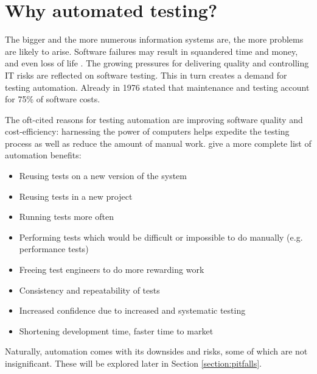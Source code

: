 \documentclass[12pt,a4paper,oneside,pdftex]{report}
\begin{document}

\section{Why automated testing?}


The bigger and the more numerous information systems are, the more problems are likely to arise. Software failures may result in squandered time and money, and even loss of life \citep{leveson1993investigation, defense1992software}. The growing pressures for delivering quality and controlling IT risks are reflected on software testing. This in turn creates a demand for testing automation. Already in 1976 \citet{myers1976software} stated that maintenance and testing account for 75\% of software costs.

The oft-cited reasons for testing automation are improving software quality and cost-efficiency: harnessing the power of computers helps expedite the testing process as well as reduce the amount of manual work. \citet{fewster1999software} give a more complete list of automation benefits:

\begin{itemize}
\item Reusing tests on a new version of the system
\item Reusing tests in a new project
\item Running tests more often
\item Performing tests which would be difficult or impossible to do manually (e.g. performance tests)
\item Freeing test engineers to do more rewarding work
\item Consistency and repeatability of tests
\item Increased confidence due to increased and systematic testing
\item Shortening development time, faster time to market
\end{itemize}

Naturally, automation comes with its downsides and risks, some of which are not insignificant. These will be explored later in Section \ref{section:pitfalls}.
\end{document}
